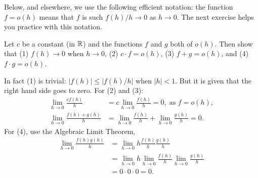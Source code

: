 Below, and elsewhere, we use the following efficient notation:  the function $f=o(h)$ means that $f$ is such $f(h)/h \to 0$ as $h\to 0$.  The next exercise helps you practice with this notation.
\begin{exercise}
  Let $c$ be a constant (in $\mathbb{R}$) and the functions $f$ and $g$ both of $o(h)$. Then show that (1) $f(h) \to 0$ when $h\to 0$, (2) $c\cdot f = o(h)$, (3) $f+g=o(h)$, and (4) $f\cdot g=o(h)$. 
 \begin{solution}
In fact (1) is trivial: $|f(h)| \leq |f(h)/h|$ when $|h| < 1$. But it is given that the right hand side goes to zero.  For (2) and (3):
\begin{align*}
\lim_{h\to 0} \frac{c f(h)}{h} &=  c \lim_{h\to 0} \frac{f(h)}{h} = 0, \; \text{as } f = o(h), \\
\lim_{h\to 0} \frac{f(h) + g(h)} h &= \lim_{h\to 0} \frac{f(h)} h + \lim_{h\to 0} \frac{g(h)} h = 0.
\end{align*}
For (4), use  the Algebraic Limit Theorem,
\begin{align*}
\lim_{h\to 0} \frac{f(h)g(h)}{h} &= \lim_{h\to 0} h \frac{f(h)}{h} \frac{g(h)}{h} \\
&= \lim_{h\to 0} h \lim_{h\to 0} \frac{f(h)}{h} \lim_{h\to 0} \frac{g(h)}{h} \\
&= 0 \cdot 0 \cdot 0 = 0.
\end{align*}
  \end{solution}
\end{exercise}



